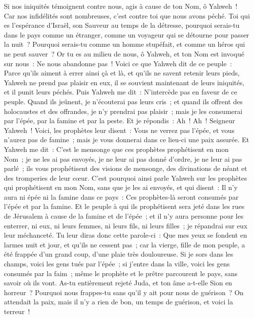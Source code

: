 \begin{multicols}{2}
Si nos iniquités témoignent contre nous, agis à cause de ton Nom, ô Yahweh~! Car nos infidélités sont nombreuses, c'est contre toi que nous avons péché.
Toi qui es l'espérance d'Israël, son Sauveur au temps de la détresse, pourquoi serais-tu dans le pays comme un étranger, comme un voyageur qui se détourne pour passer la nuit~?
Pourquoi serais-tu comme un homme stupéfait, et comme un héros qui ne peut sauver~? Or tu es au milieu de nous, ô Yahweh, et ton Nom est invoqué sur nous~: Ne nous abandonne pas~!
Voici ce que Yahweh dit de ce peuple~: Parce qu'ils aiment à errer ainsi çà et là, et qu'ils ne savent retenir leurs pieds, Yahweh ne prend pas plaisir en eux, il se souvient maintenant de leurs iniquités, et il punit leurs péchés.
Puis Yahweh me dit~: N'intercède pas en faveur de ce peuple.
Quand ils jeûnent, je n'écouterai pas leurs cris~; et quand ils offrent des holocaustes et des offrandes, je n'y prendrai pas plaisir~; mais je les consumerai par l'épée, par la famine et par la peste.
Et je répondis~: Ah~! Ah~! Seigneur Yahweh~! Voici, les prophètes leur disent~: Vous ne verrez pas l'épée, et vous n'aurez pas de famine~; mais je vous donnerai dans ce lieu-ci une paix assurée.
Et Yahweh me dit~: C'est le mensonge que ces prophètes prophétisent en mon Nom~; je ne les ai pas envoyés, je ne leur ai pas donné d'ordre, je ne leur ai pas parlé~; ils vous prophétisent des visions de mensonge, des divinations de néant et des tromperies de leur cœur.
C'est pourquoi ainsi parle Yahweh sur les prophètes qui prophétisent en mon Nom, sans que je les ai envoyés, et qui disent~: Il n'y aura ni épée ni la famine dans ce pays~: Ces prophètes-là seront consumés par l'épée et par la famine.
Et le peuple à qui ils prophétisent sera jeté dans les rues de Jérusalem à cause de la famine et de l'épée~; et il n'y aura personne pour les enterrer, ni eux, ni leurs femmes, ni leurs fils, ni leurs filles~; je répandrai sur eux leur méchanceté.
Tu leur diras donc cette parole-ci~: Que mes yeux se fondent en larmes nuit et jour, et qu'ils ne cessent pas~; car la vierge, fille de mon peuple, a été frappée d'un grand coup, d'une plaie très douloureuse.
Si je sors dans les champs, voici les gens tués par l'épée~; si j'entre dans la ville, voici les gens consumés par la faim~; même le prophète et le prêtre parcourent le pays, sans savoir où ils vont.
As-tu entièrement rejeté Juda, et ton âme a-t-elle Sion en horreur~? Pourquoi nous frappes-tu sans qu'il y ait pour nous de guérison~? On attendait la paix, mais il n'y a rien de bon, un temps de guérison, et voici la terreur~!

\end{multicols}
